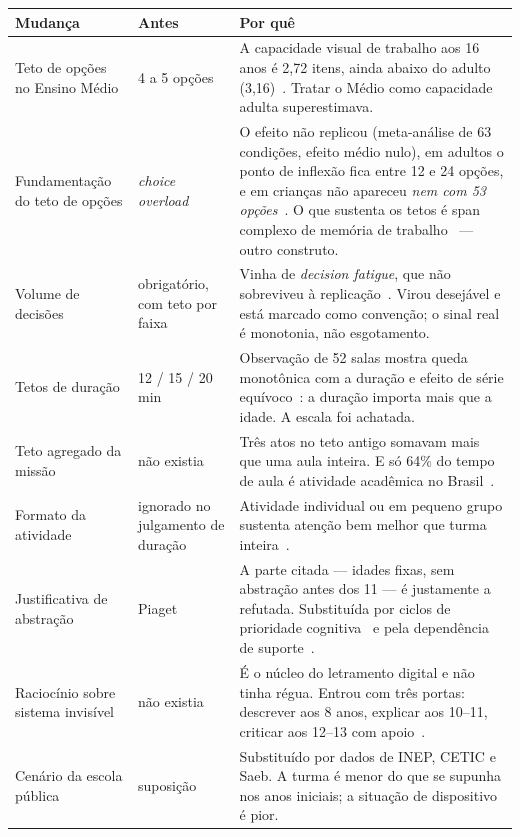 \documentclass[11pt,a4paper]{article}
\begin{document}
\begin{center}
\begin{longtable}{p{4.2cm}p{4.6cm}p{5.7cm}}
\toprule
\textbf{Mudança} & \textbf{Antes} & \textbf{Por quê} \\
\midrule
\endfirsthead
Teto de opções no Ensino Médio & 4 a 5 opções &
A capacidade visual de trabalho aos 16 anos é 2,72 itens, ainda abaixo do adulto
(3,16)~\cite{isbell2015}. Tratar o Médio como capacidade adulta superestimava. \\
\addlinespace
Fundamentação do teto de opções & \emph{choice overload} &
O efeito não replicou (meta-análise de 63 condições, efeito médio nulo), em adultos o ponto de
inflexão fica entre 12 e 24 opções, e em crianças não apareceu \emph{nem com 53
opções}~\cite{castelo2023}. O que sustenta os tetos é span complexo de memória de
trabalho~\cite{gathercole2004,cowan2016} --- outro construto. \\
\addlinespace
Volume de decisões & obrigatório, com teto por faixa &
Vinha de \emph{decision fatigue}, que não sobreviveu à replicação~\cite{hagger2016}. Virou
desejável e está marcado como convenção; o sinal real é monotonia, não esgotamento. \\
\addlinespace
Tetos de duração & 12 / 15 / 20 min &
Observação de 52 salas mostra queda monotônica com a duração e efeito de série
equívoco~\cite{godwin2016}: a duração importa mais que a idade. A escala foi achatada. \\
\addlinespace
Teto agregado da missão & não existia &
Três atos no teto antigo somavam mais que uma aula inteira. E só 64\% do tempo de aula é atividade
acadêmica no Brasil~\cite{bruns2018}. \\
\addlinespace
Formato da atividade & ignorado no julgamento de duração &
Atividade individual ou em pequeno grupo sustenta atenção bem melhor que turma
inteira~\cite{godwin2016}. \\
\addlinespace
Justificativa de abstração & Piaget &
A parte citada --- idades fixas, sem abstração antes dos 11 --- é justamente a refutada. Substituída
por ciclos de prioridade cognitiva~\cite{demetriou2022} e pela dependência de
suporte~\cite{fischer1980}. \\
\addlinespace
Raciocínio sobre sistema invisível & não existia &
É o núcleo do letramento digital e não tinha régua. Entrou com três portas: descrever aos 8 anos,
explicar aos 10--11, criticar aos 12--13 com apoio~\cite{starks2024,rozendaal2011}. \\
\addlinespace
Cenário da escola pública & suposição & Substituído por dados de INEP, CETIC e Saeb. A turma é menor
do que se supunha nos anos iniciais; a situação de dispositivo é pior. \\
\bottomrule
\end{longtable}
\end{center}
\end{document}
